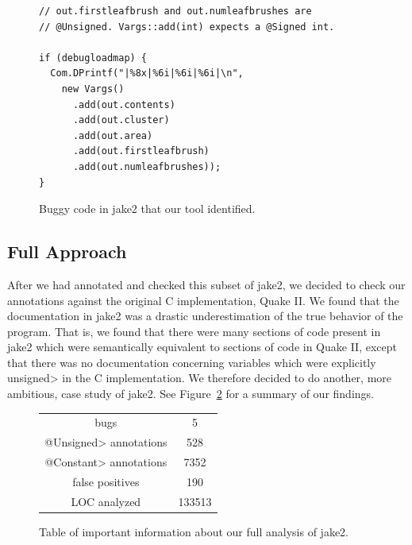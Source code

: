 \begin{figure}[t]
\begin{lstlisting}
// out.firstleafbrush and out.numleafbrushes are
// @Unsigned. Vargs::add(int) expects a @Signed int.

if (debugloadmap) {
  Com.DPrintf("|%8x|%6i|%6i|%6i|\n",
    new Vargs()
      .add(out.contents)
      .add(out.cluster)
      .add(out.area)
      .add(out.firstleafbrush)
      .add(out.numleafbrushes));
}

\end{lstlisting}
\vspace{-10pt}
\caption{Buggy code in jake2 that our tool identified.}
\label{fig:bug}
\end{figure}

\subsection{Full Approach} \label{full}
After we had annotated and checked this subset of jake2, we decided to check
our annotations against the original C implementation, Quake II. We found that
the documentation in jake2 was a drastic underestimation of the true behavior
of the program. That is, we found that there were many sections of code present
in jake2 which were semantically equivalent to sections of code in Quake II,
except that there was no documentation concerning variables which were
explicitly \<unsigned> in the C implementation. We therefore decided to do
another, more ambitious, case study of jake2. See Figure~\ref{fig:results} for
a summary of our findings.

\begin{figure}[t]
\begin{tabular}{|c|c|}
\hline
bugs & 5\\
\<@Unsigned> annotations & 528\\
\<@Constant> annotations & 7352\\
false positives & 190\\
LOC analyzed & 133513\\
\hline
\end{tabular}
\vspace{-10pt}
\caption{Table of important information about our full analysis of jake2.}
\label{fig:results}
\end{figure}

